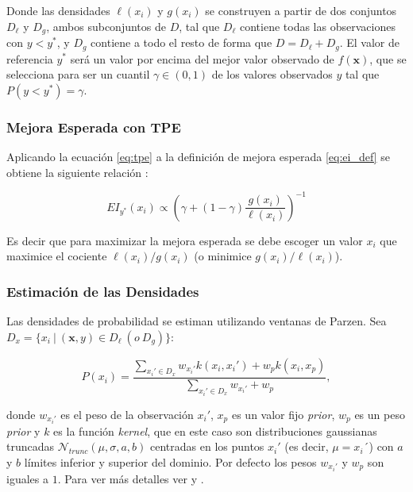 Donde las densidades $\ell(x_i)$ y $g(x_i)$ se construyen a partir de dos conjuntos $D_{\ell}$ y $D_g$, ambos subconjuntos de $D$, tal que $D_{\ell}$ contiene todas las observaciones con $y < y^*$, y $D_g$ contiene a todo el resto de forma que $D = D_{\ell} + D_g$. El valor de referencia $y^{*}$ será un valor por encima del mejor valor observado de $f(\textbf{x})$, que se selecciona para ser un cuantil $\gamma \in (0,1)$ de los valores observados $y$ tal que $P(y<y^{*}) = \gamma$.


\subsubsection*{Mejora Esperada con TPE}
Aplicando la ecuación \eqref{eq:tpe} a la definición de mejora esperada \eqref{eq:ei_def} se obtiene la siguiente relación \cite{NIPS2011_86e8f7ab}:

\begin{equation}
EI_{y^*}(x_i) \propto \left( \gamma + (1-\gamma) \frac{g(x_i)}{\ell (x_i)} \right)^{-1}
\end{equation}

Es decir que para maximizar la mejora esperada se debe escoger un valor $x_i$ que maximice el cociente $\ell(x_i)/g(x_i)$ (o minimice $g(x_i)/\ell(x_i)$).

\subsubsection*{Estimación de las Densidades}

Las densidades de probabilidad se estiman utilizando ventanas de Parzen. Sea $D_x = \{x_i \ | \ (\textbf{x}, y) \in D_{\ell} \ (o\ D_g) \}$:

\begin{equation}
P(x_i) = \frac{\sum_{x_i'\in D_x}w_{x_i'}k(x_i, x_i') + w_p k(x_i, x_p) }{\sum_{x_i'\in D_x}w_{x_i'}+w_p},
\end{equation}
 

donde $w_{x_i'}$ es el peso de la observación $x_i'$, $x_p$ es un valor fijo \textit{prior}, $w_p$ es un peso \textit{prior} y $k$ es la función \textit{kernel}, que en este caso son distribuciones gaussianas truncadas $\mathcal{N}_{trunc}(\mu, \sigma, a, b)$ centradas en los puntos $x_i'$ (es decir, $\mu = x_i´$) con $a$ y $b$ límites inferior y superior del dominio. Por defecto los pesos $w_{x_i'}$ y $w_p$ son iguales a $1$. Para ver más detalles ver \cite{10.1613/jair.1.13188} y \cite{NIPS2011_86e8f7ab}.

